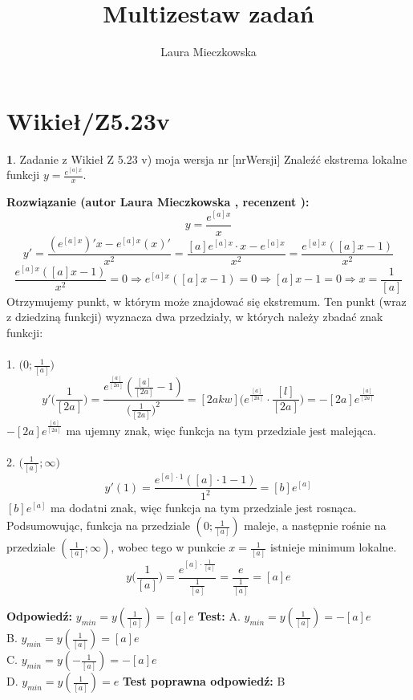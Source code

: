 \documentclass[12pt, a4paper]{article}
\title{Multizestaw zadań}
\author{Laura Mieczkowska}
\date{}
\theoremstyle{definition} %
\newtheorem{zad}{}
\newcommand{\kategoria}[1]{\section{#1}} %
\newcommand{\zadStart}[1]{\begin{zad}#1\newline} %
\newcommand{\zadStop}{\end{zad}}   %
\newcommand{\rozwStart}[2]{\noindent \textbf{Rozwiązanie (autor #1 , recenzent #2): }\newline} %
\newcommand{\odpStart}{\noindent \textbf{Odpowiedź:}\newline}    %
\newcommand{\odpStop}{\newline}                                             %
\newcommand{\testStart}{\noindent \textbf{Test:}\newline} %
\newcommand{\testStop}{\newline} %
\newcommand{\kluczStart}{\noindent \textbf{Test poprawna odpowiedź:}\newline} %
\newcommand{\kluczStop}{\newline} %
\begin{document}
\maketitle


\kategoria{Wikieł/Z5.23v}
\zadStart{Zadanie z Wikieł Z 5.23 v) moja wersja nr [nrWersji]}
Znaleźć ekstrema lokalne funkcji $y=\frac{e^{[a]x}}{x}$.
\zadStop
\rozwStart{Laura Mieczkowska}{}
$$y=\frac{e^{[a]x}}{x}$$
$$y'=\frac{(e^{[a]x})'x-e^{[a]x}(x)'}{x^2}=\frac{[a]e^{[a]x}\cdot x-e^{[a]x}}{x^2}=\frac{e^{[a]x}([a]x-1)}{x^2}$$
$$\frac{e^{[a]x}([a]x-1)}{x^2}=0 \Rightarrow e^{[a]x}([a]x-1)=0 \Rightarrow [a]x-1=0 \Rightarrow x=\frac{1}{[a]}$$
Otrzymujemy punkt, w którym może znajdować się ekstremum. Ten punkt (wraz z dziedziną funkcji) wyznacza dwa przedziały, w których należy zbadać znak funkcji:
\\\\1. $\big(0;\frac{1}{[a]}\big)$
$$y'\bigg(\frac{1}{[2a]}\bigg)=\frac{e^{\frac{[a]}{[2a]}}(\frac{[a]}{[2a]}-1)}{\big(\frac{1}{[2a]}\big)^2}=[2akw]\bigg(e^{\frac{[a]}{[2a]}}\cdot\frac{[l]}{[2a]}\bigg)=-[2a]e^{\frac{[a]}{[2a]}}$$
$-[2a]e^{\frac{[a]}{[2a]}}$ ma ujemny znak, więc funkcja na tym przedziale jest malejąca.
\\\\2. $\big(\frac{1}{[a]};\infty\big)$
$$y'(1)=\frac{e^{[a]\cdot 1}([a]\cdot1-1)}{1^2}=[b]e^{[a]}$$
$[b]e^{[a]}$ ma dodatni znak, więc funkcja na tym przedziale jest rosnąca.
\\Podsumowując, funkcja na przedziale $(0;\frac{1}{[a]})$ maleje, a następnie rośnie na przedziale $(\frac{1}{[a]};\infty)$, wobec tego w punkcie $x=\frac{1}{[a]}$ istnieje minimum lokalne.
$$y\bigg(\frac{1}{[a]}\bigg)=\frac{e^{[a]\cdot\frac{1}{[a]}}}{\frac{1}{[a]}}=\frac{e}{\frac{1}{[a]}}=[a]e$$

\odpStart
$y_{min}=y(\frac{1}{[a]})=[a]e$
\odpStop
\testStart
A. $y_{min}=y(\frac{1}{[a]})=-[a]e$\\
B. $y_{min}=y(\frac{1}{[a]})=[a]e$ \\
C. $y_{min}=y(-\frac{1}{[a]})=-[a]e$ \\
D. $y_{min}=y(\frac{1}{[a]})=e$ 
\testStop
\kluczStart
B
\kluczStop
\end{document}
